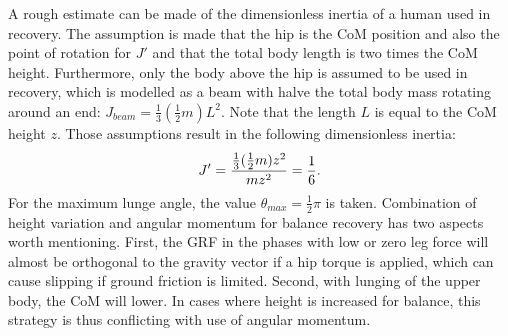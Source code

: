 \paraskip
A rough estimate can be made of the dimensionless inertia of a human used in recovery. The assumption is made that the hip is the \ac{CoM} position and also the point of rotation for $J'$ and that the total body length is two times the \ac{CoM} height. Furthermore, only the body above the hip is assumed to be used in recovery, which is modelled as a beam with halve the total body mass rotating around an end: $J_{beam} = \frac{1}{3}(\frac{1}{2}m)L^2$. Note that the length $L$ is equal to the \ac{CoM} height $z$. Those assumptions result in the following dimensionless inertia:
\begin{equation}
	J' = \frac{\frac{1}{3}(\frac{1}{2}m)z^2}{mz^2} = \frac{1}{6}.
\end{equation}
For the maximum lunge angle, the value $\theta_{max} = \frac{1}{2}\pi$ is taken. 
\paraskip
Combination of height variation and angular momentum for balance recovery has two aspects worth mentioning. First, the \ac{GRF} in the phases with low or zero leg force will almost be orthogonal to the gravity vector if a hip torque is applied, which can cause slipping if ground friction is limited. Second, with lunging of the upper body, the \ac{CoM} will lower. In cases where height is increased for balance, this strategy is thus conflicting with use of angular momentum.

